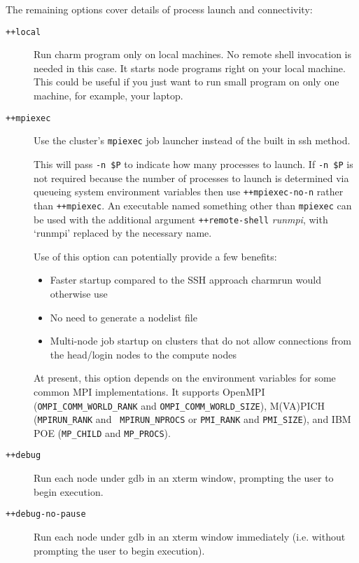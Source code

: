 The remaining options cover details of process launch and connectivity:

\begin{description}

\item[{\tt ++local}] Run charm program only on local machines. No
 remote shell invocation is needed in this case. It starts node programs
 right on your local machine. This could be useful if you just want to
 run small program on only one machine, for example, your laptop.


\item[{\tt ++mpiexec}]
\label{mpiexec}
Use the cluster's {\tt mpiexec} job launcher instead of the built in ssh
method.

This will pass {\tt -n \$P} to indicate how many processes to
launch.
If {\tt -n \$P} is not required because the number of processes
to launch is determined via queueing system environment variables
then use {\tt ++mpiexec-no-n} rather than {\tt ++mpiexec}.
An executable named something other than {\tt mpiexec} can be
used with the additional argument {\tt ++remote-shell} {\it runmpi},
with `runmpi' replaced by the necessary name.

Use of this option can potentially provide a few benefits:

\begin{itemize}
\item Faster startup compared to the SSH approach charmrun would
  otherwise use
\item No need to generate a nodelist file
\item Multi-node job startup on clusters that do not allow connections
  from the head/login nodes to the compute nodes
\end{itemize}

At present, this option depends on the environment variables for some
common MPI implementations. It supports OpenMPI ({\tt OMPI\_COMM\_WORLD\_RANK} and
{\tt OMPI\_COMM\_WORLD\_SIZE}), M(VA)PICH ({\tt MPIRUN\_RANK} and {\tt
  MPIRUN\_NPROCS} or {\tt PMI\_RANK} and {\tt PMI\_SIZE}),
and IBM POE ({\tt MP\_CHILD} and {\tt MP\_PROCS}).

\item[{\tt ++debug}] Run each node under gdb in an xterm window, prompting
the user to begin execution.

\item[{\tt ++debug-no-pause}] Run each node under gdb in an xterm window
immediately (i.e. without prompting the user to begin execution).


\end{description}
